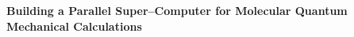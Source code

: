 

\setlength{\textwidth}{7in}
\setlength{\textheight}{9.0in}
\setlength{\oddsidemargin}{-.25in}
%
\setlength{\topmargin}{-.10in}
\def\Real{\rm I\hspace{-0.2em}R}
\def\nin{{\in \! \! \! \! \! /} \,}
\def\nequiv{{\equiv \! \! \! \! \! \! /} \,}

\newcommand{\half}{\mbox{$\frac{1}{2}$}}
\newcommand{\mul}{\multicolumn{2}{c}{none}}
\newcommand{\qua}{\mbox{$\frac{1}{4}$}}
\newcommand{\six}{\mbox{$\frac{1}{6}$}}
\newcommand{\tfour}{\mbox{$\frac{1}{24}$}}
\newcommand{\beq}{\begin{equation}}
\newcommand{\eeq}{\end{equation}}
\newcommand{\tripler}{T_{3}\!\left(^{a^{\prime}b^{\prime}
{\rm C}^{\prime}}_{{\rm I}^{\prime}j^{\prime}k^{\prime}}\right)}
\newcommand{\quadrupler}{T_{4}\!\left(^{a^{\prime}b^{\prime}
{\rm C}^{\prime}{\rm D}^{\prime}}_{{\rm I}^{\prime}{\rm J}^{\prime}
k^{\prime}l^{\prime}}\right)}






\setlength{\baselineskip}{1em}


\noindent
{\bf Building a Parallel Super--Computer for Molecular
Quantum Mechanical Calculations}




